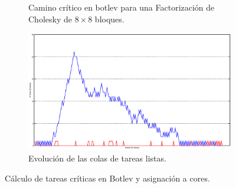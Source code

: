 \begin{figure}
  \centering
  \setlength{\fboxsep}{5pt}
  
  \begin{subfigure}{.45\textwidth}
    \centering
    \caption{Camino crítico en botlev para una Factorización de Cholesky de
      $8\times8$ bloques.}
    \label{s3:fig:botlev_tdg}
  \end{subfigure}
  \begin{subfigure}{.45\textwidth}
    \centering
    \includegraphics[width=1\linewidth]{Figures/botlev-colas.eps}
    \caption{Evolución de las colas de tareas listas.}
    \label{s3:fig:botlev_colas}
  \end{subfigure}  
  
  \caption{Cálculo de tareas críticas en Botlev y asignación a cores.}
  \label{s3:fig:botlev}
\end{figure}






